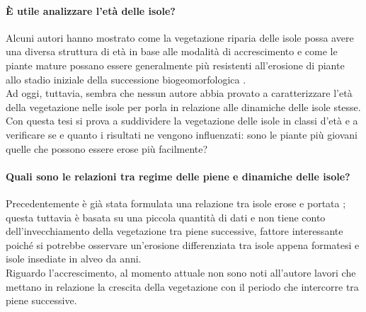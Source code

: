 \paragraph{È utile analizzare l'età delle isole?}
Alcuni autori hanno mostrato come la vegetazione riparia delle isole possa avere una diversa struttura di età in base alle modalità di accrescimento e come le piante mature possano essere generalmente più resistenti all'erosione di piante allo stadio iniziale della successione biogeomorfologica .
\\
Ad oggi, tuttavia, sembra che nessun autore abbia provato a caratterizzare l'età della vegetazione nelle isole per porla in relazione alle dinamiche delle isole stesse.
\\
Con questa tesi si prova a suddividere la vegetazione delle isole in classi d'età e a verificare se e quanto i risultati ne vengono influenzati: sono le piante più giovani quelle che possono essere erose più facilmente?

\paragraph{Quali sono le relazioni tra regime delle piene e dinamiche delle isole?}
Precedentemente è già stata formulata una relazione tra isole erose e portata ;
questa tuttavia è basata su una piccola quantità di dati e non tiene conto dell'invecchiamento della vegetazione tra piene successive, fattore interessante poiché si potrebbe osservare un'erosione differenziata tra isole appena formatesi e isole insediate in alveo da anni.
\\
Riguardo l'accrescimento, al momento attuale non sono noti all'autore lavori che mettano in relazione la crescita della vegetazione con il periodo che intercorre tra piene successive.

